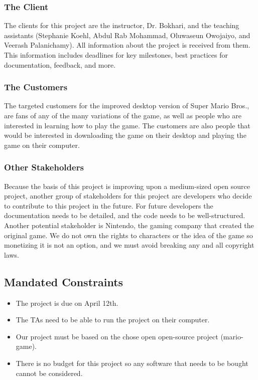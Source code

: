 \documentclass[12pt, titlepage]{article}
\begin{document}
\subsubsection{The Client}
The clients for this project are the instructor, Dr. Bokhari, and the teaching assistants (Stephanie Koehl, Abdul Rab Mohammad, Oluwaseun Owojaiyo, and Veerash Palanichamy). All information about the project is received from them. This information includes deadlines for key milestones, best practices for documentation, feedback, and more.

\subsubsection{The Customers}
The targeted customers for the improved desktop version of Super Mario Bros., are fans of any of the many variations of the game, as well as people who are interested in learning how to play the game. The customers are also people that would be interested in downloading the game on their desktop and playing the game on their computer.

\subsubsection{Other Stakeholders}
Because the basis of this project is improving upon a medium-sized open source project, another group of stakeholders for this project are developers who decide to contribute to this project in the future. For future developers the documentation needs to be detailed, and the code needs to be well-structured. Another potential stakeholder is Nintendo, the gaming company that created the original game. We do not own the rights to characters or the idea of the game so monetizing it is not an option, and we must avoid breaking any and all copyright laws.

\subsection{Mandated Constraints}
	\begin{itemize}
		\item The project is due on April 12th.
		\item The TAs need to be able to run the project on their computer.
		\item Our project must be based on the chose open open-source project (mario-game).
		\item There is no budget for this project so any software that needs to be bought cannot be considered.
	\end{itemize}
\end{document}

